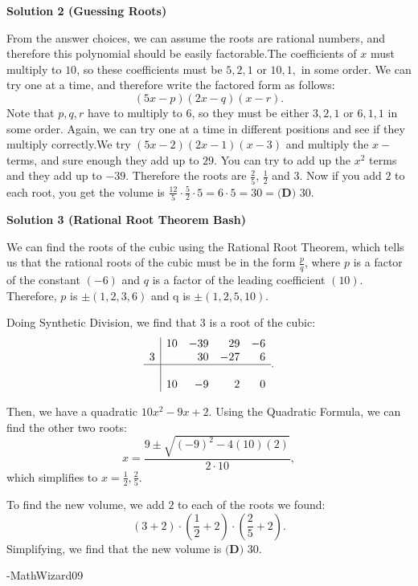 \begin{enumerate}
\textbf{Solution 2 (Guessing Roots)}

From the answer choices, we can assume the roots are rational numbers, and therefore this polynomial should be easily factorable.The coefficients of $x$ must multiply to $10$, so these coefficients must be $5,2,1$ or $10,1,$ in some order. We can try one at a time, and therefore write the factored form as follows: 
 \[(5x-p)(2x-q)(x-r).\]Note that $p, q, r$ have to multiply to $6$, so they must be either $3,2,1$ or $6,1,1$ in some order. Again, we can try one at a time in different positions and see if they multiply correctly.We try $(5x-2)(2x-1)(x-3)$ and multiply the $x-$terms, and sure enough they add up to $29$. You can try to add up the $x^2$ terms and they add up to $-39$. Therefore the roots are $\frac{2}{5}$, $\frac{1}{2}$ and $3$. Now if you add $2$ to each root, you get the volume is $\frac{12}{5} \cdot \frac{5}{2} \cdot 5 = 6 \cdot 5 = 30 = \boxed{\textbf{(D) } 30}$.

 



\textbf{Solution 3 (Rational Root Theorem Bash)}

We can find the roots of the cubic using the Rational Root Theorem, which tells us that the rational roots of the cubic must be in the form $\frac{p}{q}$, where $p$ is a factor of the constant $(-6)$ and $q$ is a factor of the leading coefficient $(10)$. Therefore, $p$ is $\pm (1, 2, 3, 6)$ and q is $\pm (1, 2, 5, 10).$

 Doing Synthetic Division, we find that $3$ is a root of the cubic:
 \[\begin{array}{c|rrrr}&10&-39&29&-6\\3&&30&-27&6\\\hline\\&10&-9&2&0\\\end{array}.\]

 Then, we have a quadratic $10x^2-9x+2.$ Using the Quadratic Formula, we can find the other two roots:
 \[x=\frac{9 \pm \sqrt{(-9)^2-4(10)(2)}}{2 \cdot 10},\]which simplifies to $x=\frac{1}{2}, \frac{2}{5}.$

 To find the new volume, we add $2$ to each of the roots we found:
 \[(3+2)\cdot\left(\frac{1}{2}+2\right)\cdot\left(\frac{2}{5}+2\right).\]Simplifying, we find that the new volume is $\boxed{\textbf{(D) } 30}.$

 -MathWizard09

 




\end{enumerate}

